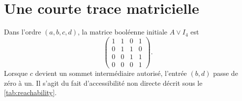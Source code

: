 \chapter{Une courte trace matricielle}
\label{app:matrix-trace}


Dans l'ordre $(a,b,c,d)$, la matrice booléenne initiale $A\lor I_4$ est
\[
\begin{pmatrix}
1&1&0&1\\
0&1&1&0\\
0&0&1&1\\
0&0&0&1
\end{pmatrix}.
\]
Lorsque $c$ devient un sommet intermédiaire autorisé, l'entrée $(b,d)$ passe de
zéro à un. Il s'agit du fait d'accessibilité non directe décrit sous le
\cref{tab:reachability}.
